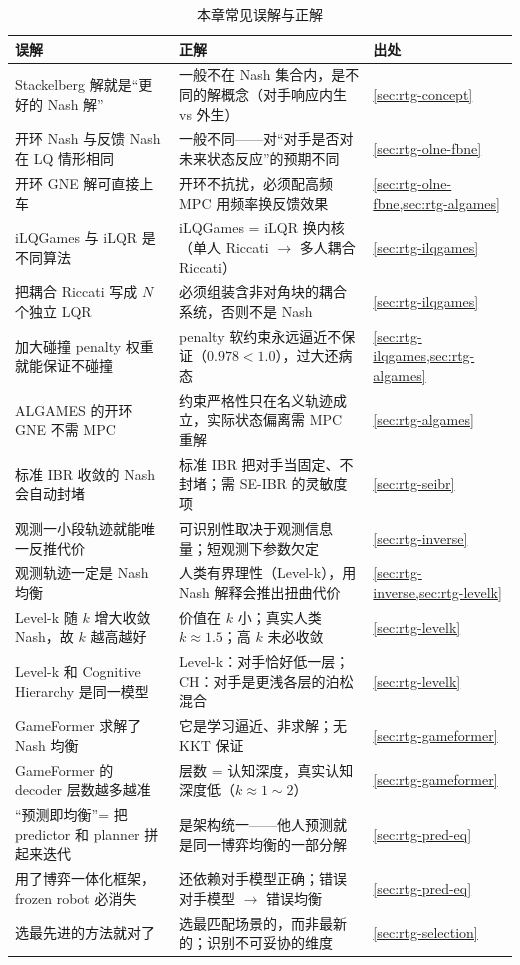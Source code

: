\begin{table}[H]\centering\small
\caption{本章常见误解与正解}
\label{tab:rtg-misconceptions}
\begin{tabularx}{\linewidth}{L L p{0.08\textwidth}}
\toprule
误解 & 正解 & 出处 \\
\midrule
Stackelberg 解就是“更好的 Nash 解” & 一般不在 Nash 集合内，是不同的解概念（对手响应内生 vs 外生） & \cref{sec:rtg-concept} \\
开环 Nash 与反馈 Nash 在 LQ 情形相同 & 一般不同——对“对手是否对未来状态反应”的预期不同 & \cref{sec:rtg-olne-fbne} \\
开环 GNE 解可直接上车 & 开环不抗扰，必须配高频 MPC 用频率换反馈效果 & \cref{sec:rtg-olne-fbne,sec:rtg-algames} \\
iLQGames 与 iLQR 是不同算法 & iLQGames = iLQR 换内核（单人 Riccati $\to$ 多人耦合 Riccati） & \cref{sec:rtg-ilqgames} \\
把耦合 Riccati 写成 $N$ 个独立 LQR & 必须组装含非对角块的耦合系统，否则不是 Nash & \cref{sec:rtg-ilqgames} \\
加大碰撞 penalty 权重就能保证不碰撞 & penalty 软约束永远逼近不保证（$0.978<1.0$），过大还病态 & \cref{sec:rtg-ilqgames,sec:rtg-algames} \\
ALGAMES 的开环 GNE 不需 MPC & 约束严格性只在名义轨迹成立，实际状态偏离需 MPC 重解 & \cref{sec:rtg-algames} \\
标准 IBR 收敛的 Nash 会自动封堵 & 标准 IBR 把对手当固定、不封堵；需 SE-IBR 的灵敏度项 & \cref{sec:rtg-seibr} \\
观测一小段轨迹就能唯一反推代价 & 可识别性取决于观测信息量；短观测下参数欠定 & \cref{sec:rtg-inverse} \\
观测轨迹一定是 Nash 均衡 & 人类有界理性（Level-k），用 Nash 解释会推出扭曲代价 & \cref{sec:rtg-inverse,sec:rtg-levelk} \\
Level-k 随 $k$ 增大收敛 Nash，故 $k$ 越高越好 & 价值在 $k$ 小；真实人类 $k\approx1.5$；高 $k$ 未必收敛 & \cref{sec:rtg-levelk} \\
Level-k 和 Cognitive Hierarchy 是同一模型 & Level-k：对手恰好低一层；CH：对手是更浅各层的泊松混合 & \cref{sec:rtg-levelk} \\
GameFormer 求解了 Nash 均衡 & 它是学习逼近、非求解；无 KKT 保证 & \cref{sec:rtg-gameformer} \\
GameFormer 的 decoder 层数越多越准 & 层数 = 认知深度，真实认知深度低（$k\approx1\sim2$） & \cref{sec:rtg-gameformer} \\
“预测即均衡”= 把 predictor 和 planner 拼起来迭代 & 是架构统一——他人预测就是同一博弈均衡的一部分解 & \cref{sec:rtg-pred-eq} \\
用了博弈一体化框架，frozen robot 必消失 & 还依赖对手模型正确；错误对手模型 $\to$ 错误均衡 & \cref{sec:rtg-pred-eq} \\
选最先进的方法就对了 & 选最匹配场景的，而非最新的；识别不可妥协的维度 & \cref{sec:rtg-selection} \\
\bottomrule
\end{tabularx}
\end{table}

